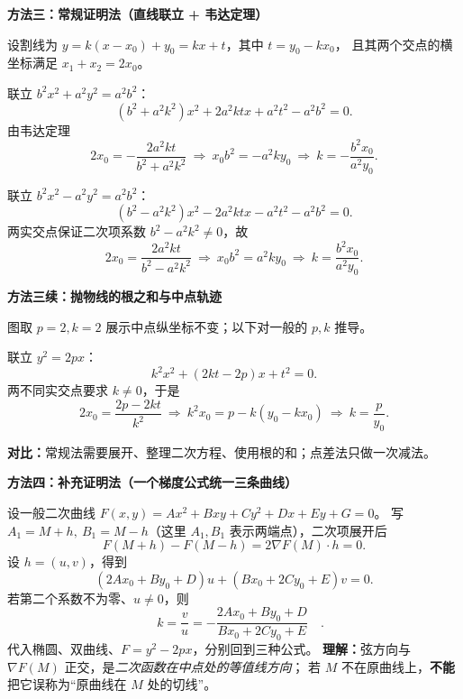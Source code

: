 \begin{proofbox}
\tcbbreak
\textbf{\textcolor{CProof}{方法三：常规证明法（直线联立 + 韦达定理）}}
\begin{center}\end{center}

设割线为 $y=k(x-x_0)+y_0=kx+t$，其中 $t=y_0-kx_0$，
且其两个交点的横坐标满足 $x_1+x_2=2x_0$。
\begin{description}[style=nextline,leftmargin=2.8em,labelsep=0.5em,itemsep=0.45em]
\item[\textbf{椭圆：}]
联立 $b^2x^2+a^2y^2=a^2b^2$：
\[
(b^2+a^2k^2)x^2+2a^2ktx+a^2t^2-a^2b^2=0.
\]
由韦达定理
\[
2x_0=-\frac{2a^2kt}{b^2+a^2k^2}
\ \Longrightarrow\ x_0b^2=-a^2ky_0
\ \Longrightarrow\ \boxed{k=-\frac{b^2x_0}{a^2y_0}}.
\]
\item[\textbf{双曲线：}]
联立 $b^2x^2-a^2y^2=a^2b^2$：
\[
(b^2-a^2k^2)x^2-2a^2ktx-a^2t^2-a^2b^2=0.
\]
两实交点保证二次项系数 $b^2-a^2k^2\ne0$，故
\[
2x_0=\frac{2a^2kt}{b^2-a^2k^2}
\ \Longrightarrow\ x_0b^2=a^2ky_0
\ \Longrightarrow\ \boxed{k=\frac{b^2x_0}{a^2y_0}}.
\]
\end{description}
\tcbbreak
\textbf{\textcolor{CProof}{方法三续：抛物线的根之和与中点轨迹}}
\begin{center}\end{center}
图取 $p=2,k=2$ 展示中点纵坐标不变；以下对一般的 $p,k$ 推导。
\begin{description}[style=nextline,leftmargin=2.8em,labelsep=0.5em,itemsep=0.45em]
\item[\textbf{抛物线：}]
联立 $y^2=2px$：
\[
k^2x^2+(2kt-2p)x+t^2=0.
\]
两不同实交点要求 $k\ne0$，于是
\[
2x_0=\frac{2p-2kt}{k^2}
\ \Longrightarrow\ k^2x_0=p-k(y_0-kx_0)
\ \Longrightarrow\ \boxed{k=\frac{p}{y_0}}.
\]
\end{description}
\textbf{对比：}常规法需要展开、整理二次方程、使用根的和；点差法只做一次减法。

\tcbbreak
\textbf{\textcolor{CProof}{方法四：补充证明法（一个梯度公式统一三条曲线）}}
\begin{center}\end{center}

设一般二次曲线 $F(x,y)=Ax^2+Bxy+Cy^2+Dx+Ey+G=0$。
写 $A_1=M+h,\ B_1=M-h$（这里 $A_1,B_1$ 表示两端点），二次项展开后
\[
F(M+h)-F(M-h)=2\nabla F(M)\cdot h=0.
\]
设 $h=(u,v)$，得到
\[
(2Ax_0+By_0+D)u+(Bx_0+2Cy_0+E)v=0.
\]
若第二个系数不为零、$u\ne0$，则
\[
\boxed{\quad k=\frac vu=-\frac{2Ax_0+By_0+D}{Bx_0+2Cy_0+E}\quad}.
\]
代入椭圆、双曲线、$F=y^2-2px$，分别回到三种公式。
\textbf{理解：}弦方向与 $\nabla F(M)$ 正交，是\emph{二次函数在中点处的等值线方向}；
若 $M$ 不在原曲线上，\textbf{不能}把它误称为“原曲线在 $M$ 处的切线”。


\end{proofbox}
